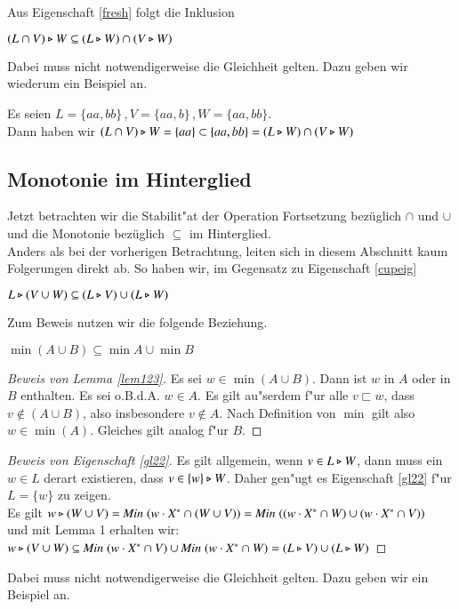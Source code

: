 Aus Eigenschaft \ref{fresh} folgt die Inklusion

\vspace{2ex}

\begin{eigen}
$(L\cap V) \triangleright W \subseteq (L\triangleright W) \cap (V\triangleright W)$
\end{eigen}
Dabei muss nicht notwendigerweise die Gleichheit gelten. Dazu geben wir wiederum ein Beispiel an.

\vspace{2ex}

\begin{beispiel}
Es seien $L= \{aa,bb\}\, ,V = \{aa,b\}\, ,W = \{aa,bb\}$. \\Dann haben wir $(L\cap V) \triangleright W = \{aa\} \subset \{aa,bb\} = (L\triangleright W) \cap (V\triangleright W)$
\end{beispiel}

\subsection{Monotonie im Hinterglied}
Jetzt betrachten wir die Stabilit"at der Operation Fortsetzung bezüglich $\cap$ und $\cup$ und die Monotonie bezüglich $\subseteq$ im Hinterglied.\\
Anders als bei der vorherigen Betrachtung, leiten sich in diesem Abschnitt kaum Folgerungen direkt ab.
So haben wir, im Gegensatz zu Eigenschaft \ref{cupeig}

\vspace{2ex}

\begin{eigen}\label{gl22}
$L\triangleright (V\cup W)\subseteq (L\triangleright V) \cup (L\triangleright W)$
\end{eigen}
Zum Beweis nutzen wir die folgende Beziehung.

\vspace{2ex}

\begin{lem}\label{lem123}
$\min (A\cup B) \subseteq \min A \cup \min B$
\end{lem}

\begin{proof}[Beweis von Lemma \ref{lem123}]
Es sei $w\in \min (A\cup B)$. Dann ist $w$ in $A$ oder in $B$ enthalten. Es sei o.B.d.A. $w\in A$. Es gilt au"serdem f"ur alle $v\sqsubset w$, dass $v\notin (A\cup B)$, also insbesondere $v\notin A$. Nach Definition von $\min$ gilt also $w\in\min(A)$. Gleiches gilt analog f"ur $B$.
\end{proof}
\begin{proof}[Beweis von Eigenschaft \ref{gl22}]
Es gilt allgemein, wenn $v\in L\triangleright W$, dann muss ein $w\in L$ derart existieren, dass $v\in \{w\}\triangleright W$. 
Daher gen"ugt es Eigenschaft \ref{gl22} f"ur $L=\{w\}$ zu zeigen.\\
Es gilt $w \triangleright (W\cup V)=\mathit{Min}\; (w\cdot X^* \cap (W\cup V)) =\mathit{Min}\; ((w\cdot X^* \cap W) \cup (w\cdot X^* \cap V))$\\
und mit Lemma 1 erhalten wir:\\
$ w\triangleright (V\cup W) \subseteq \mathit{Min}\; (w\cdot X^* \cap V) \cup \mathit{Min}\; (w\cdot X^* \cap W)=(L\triangleright V)\cup (L\triangleright W)$
\end{proof}
Dabei muss nicht notwendigerweise die Gleichheit gelten. Dazu geben wir ein Beispiel an.

